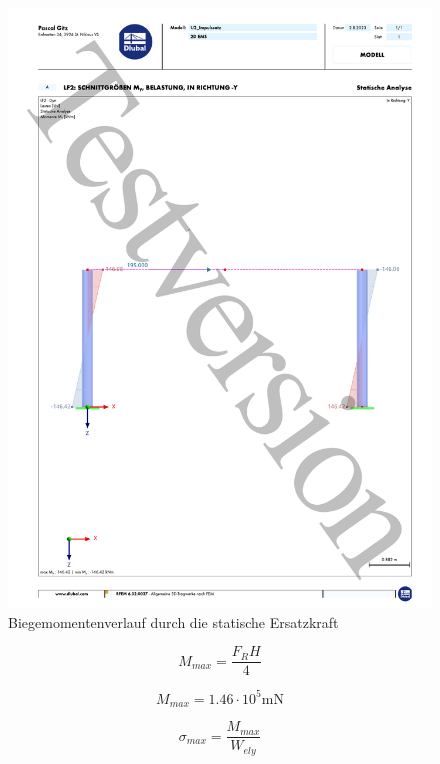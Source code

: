 \documentclass[
  letterpaper,
  DIV=11]{scrreprt}
\begin{document}
\begin{figure}[H]

{\centering \includegraphics{bilder/impulssatz_momentenverlauf.pdf}

}

\caption{Biegemomentenverlauf durch die statische Ersatzkraft}

\end{figure}

\begin{equation}M_{max} = \frac{F_{R} H}{4}\end{equation}

\begin{equation}M_{max} = 1.46 \cdot 10^{5} \text{m} \text{N}\end{equation}

\begin{equation}\sigma_{max} = \frac{M_{max}}{W_{el y}}\end{equation}
\end{document}
